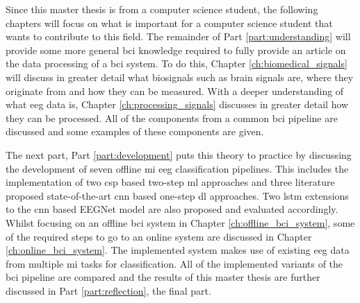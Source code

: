Since this master thesis is from a computer science student, the following chapters will focus on what is important for a computer science student that wants to contribute to this field.
The remainder of Part \ref{part:understanding} will provide some more general \gls{bci} knowledge required to fully provide an article on the data processing of a \gls{bci} system.
To do this, Chapter \ref{ch:biomedical_signals} will discuss in greater detail what \glspl{biosignal} such as brain signals are, where they originate from and how they can be measured.
With a deeper understanding of what \gls{eeg} data is, Chapter \ref{ch:processing_signals} discusses in greater detail how they can be processed.
All of the components from a common \gls{bci} pipeline are discussed and some examples of these components are given.

The next part, Part \ref{part:development} puts this theory to practice by discussing the development of seven offline \gls{mi} \gls{eeg} classification pipelines.
This includes the implementation of two \gls{csp} based two-step \gls{ml} approaches and three literature proposed state-of-the-art \gls{cnn} based one-step \gls{dl} approaches.
Two \gls{lstm} extensions to the \gls{cnn} based EEGNet model are also proposed and evaluated accordingly.
Whilst focusing on an offline \gls{bci} system in Chapter \ref{ch:offline_bci_system}, some of the required steps to go to an online system are discussed in Chapter \ref{ch:online_bci_system}.
The implemented system makes use of existing \gls{eeg} data from multiple \gls{mi} tasks for classification.
All of the implemented variants of the \gls{bci} pipeline are compared and the results of this master thesis are further discussed in Part \ref{part:reflection}, the final part.
